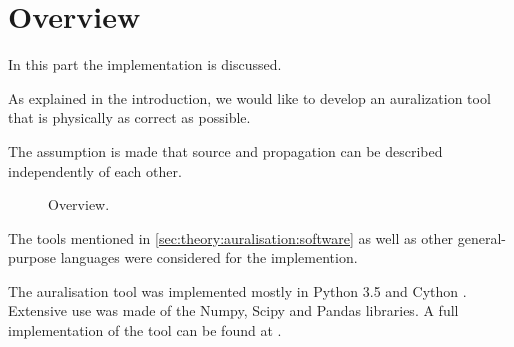 \section{Overview}

In this part the implementation is discussed.

As explained in the introduction, we would like to develop an auralization tool that is physically as correct as possible.

The assumption is made that source and propagation can be 
described independently of each other. 


\begin{figure}[H]
  \centering
{}
  \caption{Overview.}
  \label{fig:implementation:overview}
\end{figure}

The tools mentioned in \ref{sec:theory:auralisation:software} as well as other
general-purpose languages were considered for the implemention.

The auralisation tool was implemented mostly in Python 3.5 \cite{Python} and
Cython \cite{Behnel2011,Cython}. Extensive use was made of the
Numpy\cite{VanderWalt2011,Numpy}, Scipy\cite{Scipy} and
Pandas\cite{Mckinney2010} libraries. A full implementation of the tool can be
found at \cite{Rietdijk2017d}.
